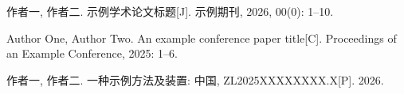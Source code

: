 \begin{publications}
  \item 作者一, 作者二. 示例学术论文标题[J]. 示例期刊, 2026, 00(0): 1--10.
  \item Author One, Author Two. An example conference paper title[C].
        Proceedings of an Example Conference, 2025: 1--6.
  \item 作者一, 作者二. 一种示例方法及装置: 中国, ZL2025XXXXXXXX.X[P]. 2026.
\end{publications}
